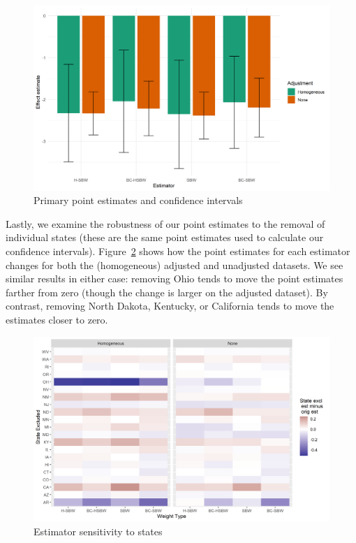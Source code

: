 \begin{figure}[H]
\begin{center}
    \caption{Primary point estimates and confidence intervals}
    \label{fig:estimators}
    \includegraphics[scale=0.6]{01_Plots/point-estimates-c1.png}
\end{center}
\end{figure}

Lastly, we examine the robustness of our point estimates to the removal of individual states (these are the same point estimates used to calculate our confidence intervals). Figure~\ref{fig:loostateplot} shows how the point estimates for each estimator changes for both the (homogeneous) adjusted and unadjusted datasets. We see similar results in either case: removing Ohio tends to move the point estimates farther from zero (though the change is larger on the adjusted dataset). By contrast, removing North Dakota, Kentucky, or California tends to move the estimates closer to zero. 

\begin{figure}[H]
\begin{center}
    \caption{Estimator sensitivity to states}
    \label{fig:loostateplot}
    \includegraphics[scale=0.6]{01_Plots/loostate-sensitivityc1-state-uu-i.png}
\end{center}
\end{figure}

